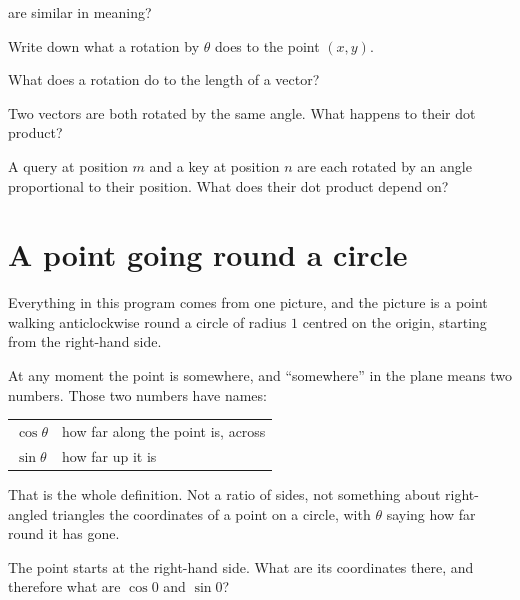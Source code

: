 \begin{quiz}
  are similar in meaning? 
\item Write down what a rotation by $\theta$ does to the point $(x, y)$.
\item What does a rotation do to the length of a vector? 
\item Two vectors are both rotated by the same angle. What happens to their
  dot product? 
\item A query at position $m$ and a key at position $n$ are each rotated by an
  angle proportional to their position. What does their dot product depend on?
\end{quiz}

\section{A point going round a circle}
\label{sec:F08-circle}

\begin{fr}
Everything in this program comes from one picture, and the picture is a point
walking anticlockwise round a circle of radius $1$ centred on the origin,
starting from the right-hand side.

At any moment the point is somewhere, and \enquote{somewhere} in the plane
means two numbers. Those two numbers have names:

\begin{center}
\begin{tabular}{ll}
\toprule
$\cos\theta$ & how far along the point is, across \\
$\sin\theta$ & how far up it is \\
\bottomrule
\end{tabular}
\end{center}

That is the whole definition. Not a ratio of sides, not something about
right-angled triangles \dash{} the coordinates of a point on a circle, with
$\theta$ saying how far round it has gone.

The point starts at the right-hand side. What are its coordinates there, and
therefore what are $\cos 0$ and $\sin 0$?
\nextframe
\end{fr}

